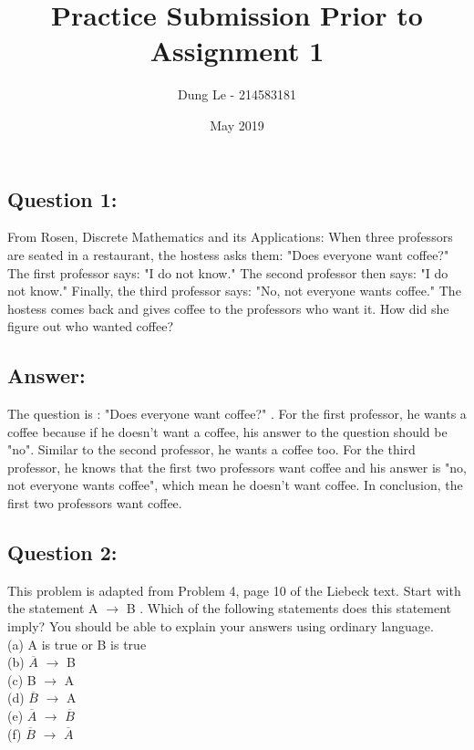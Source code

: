 \documentclass[10pt]{article}
\title{Practice Submission Prior to Assignment 1}
\author{Dung Le - 214583181}
\date{May 2019}
\begin{document}
\sloppy

\jcz{}


\maketitle

\subsection*{Question 1:}
From Rosen, Discrete Mathematics and its Applications: When three professors are seated in a restaurant, the hostess asks them: "Does everyone want coffee?" The first professor says: "I do not know." The second professor then says: "I do not know." Finally, the third professor says: "No, not everyone wants
coffee." The hostess comes back and gives coffee to the professors who want it. How did she figure out who wanted coffee?
\subsection*{Answer:}
The question is : "Does everyone want coffee?" . For the first professor, he wants a coffee because if he doesn't want a coffee, his answer to the question should be "no". Similar to the second professor, he wants a coffee too. For the third professor, he knows that the first two professors want coffee and his answer is "no, not everyone wants coffee", which mean he doesn't want coffee. In conclusion, the first two professors want coffee.
\subsection*{Question 2:}
This problem is adapted from Problem 4, page 10 of the Liebeck text.
Start with the statement A $\rightarrow$ B . Which of the following statements does this statement imply? You should be able to explain your answers using ordinary language.
\\
(a) A is true or B is true
\\
(b) $\overline{A}$ $\rightarrow$ B
\\
(c) B $\rightarrow$ A
\\
(d) $\overline{B}$ $\rightarrow$ A
\\
(e) $\overline{A}$ $\rightarrow$  $\overline{B}$
\\
(f) $\overline{B}$ $\rightarrow$  $\overline{A}$
\end{document}
